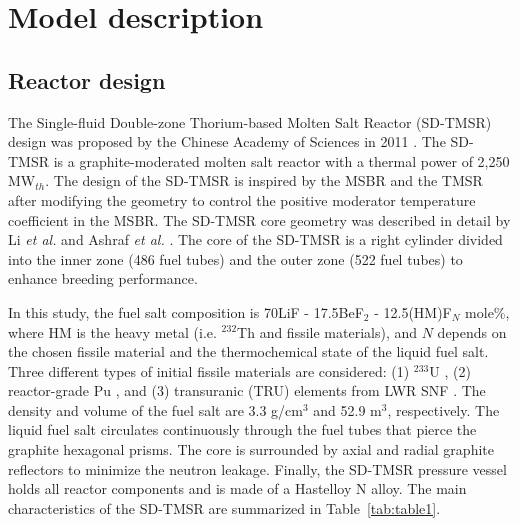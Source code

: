 \section{Model description} \label{Model-description}
\subsection{Reactor design}

The Single-fluid Double-zone Thorium-based Molten Salt Reactor (SD-TMSR) design was proposed by the Chinese Academy of Sciences in 2011 
\cite{li_optimization_2018,jiang2012advanced,li2015analysis,li2017model}. The 
\gls{SD-TMSR} is a graphite-moderated molten salt reactor with a thermal power 
of 2,250 MW$_{th}$. The design of the \gls{SD-TMSR} is inspired by the 
\gls{MSBR} \cite{robertson_conceptual_1971} and the \gls{TMSR} 
\cite{nuttin2005potential} after modifying the geometry to control the 
positive moderator temperature coefficient in the MSBR. The \gls{SD-TMSR} core 
geometry was described in detail by Li \emph{et al.} and Ashraf \emph{et al.}
\cite{li_optimization_2018,ashraf2019whole_core}. The core of the  
\gls{SD-TMSR} is a right cylinder divided into the inner zone (486 fuel tubes) 
and the outer zone (522 fuel tubes) to enhance breeding performance.

In this study, the fuel salt composition is 70LiF - 17.5BeF$_2$ - 
12.5(HM)F$_N$ mole\%, where HM is the heavy metal (i.e. $^{232}$Th and fissile 
materials), and $N$ depends on the chosen fissile material and the  
thermochemical state of the liquid fuel salt. Three different types of initial 
fissile materials are considered: (1) $^{233}$U \cite{ashraf2019whole_core}, 
(2) reactor-grade Pu \cite{marka1993explosive}, and (3) transuranic (TRU) 
elements from \gls{LWR} \gls{SNF} \cite{de2000scenarios}.
The density and volume of the fuel salt are 3.3 g/cm$^{3}$ and 52.9 m$^3$, 
respectively. The liquid fuel salt circulates continuously through the fuel 
tubes that pierce the graphite hexagonal prisms. The core is surrounded by 
axial and radial graphite reflectors to minimize the neutron leakage. Finally, 
the \gls{SD-TMSR} pressure vessel holds all reactor components and is made of 
a Hastelloy N alloy. The main characteristics of the \gls{SD-TMSR} are 
summarized in Table~\ref{tab:table1}.


